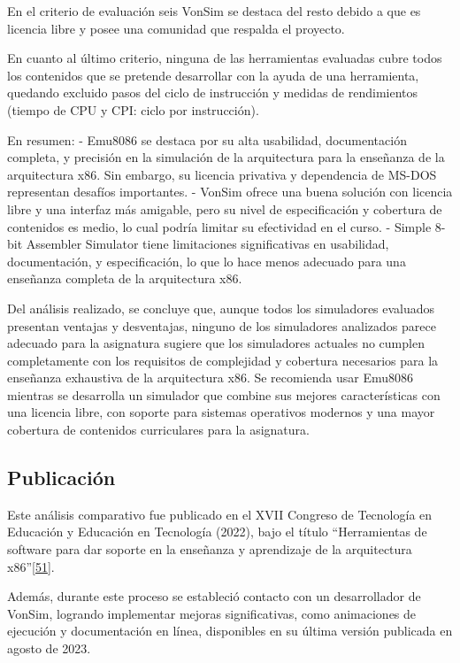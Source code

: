 \documentclass[12pt,oneside]{templates/unerthesis}
\begin{document}
En el criterio de evaluación seis VonSim se destaca del resto debido a que es licencia libre y posee una comunidad que respalda el proyecto.

En cuanto al último criterio, ninguna de las herramientas evaluadas cubre todos los contenidos que se pretende desarrollar con la ayuda de una herramienta, quedando excluido pasos del ciclo de instrucción y medidas de rendimientos (tiempo de CPU y CPI: ciclo por instrucción).

En resumen:
- Emu8086 se destaca por su alta usabilidad, documentación completa, y precisión en la simulación de la arquitectura para la enseñanza de la arquitectura x86. Sin embargo, su licencia privativa y dependencia de MS-DOS representan desafíos importantes.
- VonSim ofrece una buena solución con licencia libre y una interfaz más amigable, pero su nivel de especificación y cobertura de contenidos es medio, lo cual podría limitar su efectividad en el curso.
- Simple 8-bit Assembler Simulator tiene limitaciones significativas en usabilidad, documentación, y especificación, lo que lo hace menos adecuado para una enseñanza completa de la arquitectura x86.

Del análisis realizado, se concluye que, aunque todos los simuladores evaluados presentan ventajas y desventajas, ninguno de los simuladores analizados parece adecuado para la asignatura sugiere que los simuladores actuales no cumplen completamente con los requisitos de complejidad y cobertura necesarios para la enseñanza exhaustiva de la arquitectura x86. Se recomienda usar Emu8086 mientras se desarrolla un simulador que combine sus mejores características con una licencia libre, con soporte para sistemas operativos modernos y una mayor cobertura de contenidos curriculares para la asignatura.

\hypertarget{publicaciuxf3n}{%
\subsection{Publicación}\label{publicaciuxf3n}}

Este análisis comparativo fue publicado en el XVII Congreso de Tecnología en Educación y Educación en Tecnología (2022), bajo el título ``Herramientas de software para dar soporte en la enseñanza y aprendizaje de la arquitectura x86''\protect\hyperlink{ref-colombani_herramientas_2022}{{[}51{]}}.

Además, durante este proceso se estableció contacto con un desarrollador de VonSim, logrando implementar mejoras significativas, como animaciones de ejecución y documentación en línea, disponibles en su última versión publicada en agosto de 2023.
\end{document}
